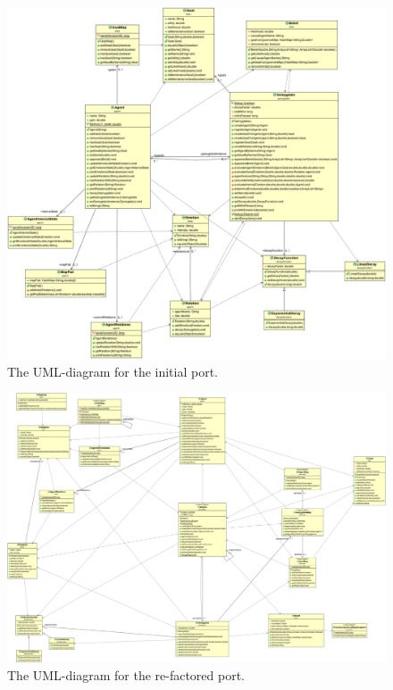 \begin{figure}
\includegraphics[width=\linewidth]{GAMYGDALA_UML_OLD}
\caption{The UML-diagram for the initial port.}
\end{figure}

\pagebreak

\begin{figure}
\includegraphics[width=\linewidth]{GAMYGDALA_UML_NEW}
\caption{The UML-diagram for the re-factored port.}
\end{figure}

\pagebreak

